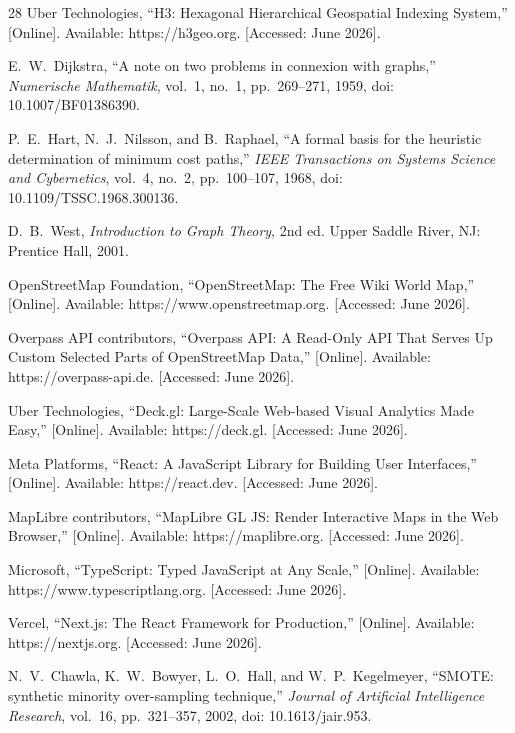 \documentclass[conference]{IEEEtran}
\begin{document}
\begin{thebibliography}{28}
Uber Technologies, ``H3: Hexagonal Hierarchical Geospatial Indexing System,'' [Online]. Available: https://h3geo.org. [Accessed: June 2026].

E.~W.~Dijkstra, ``A note on two problems in connexion with graphs,'' \emph{Numerische Mathematik}, vol.~1, no.~1, pp.~269--271, 1959, doi: 10.1007/BF01386390.

P.~E.~Hart, N.~J.~Nilsson, and B.~Raphael, ``A formal basis for the heuristic determination of minimum cost paths,'' \emph{IEEE Transactions on Systems Science and Cybernetics}, vol.~4, no.~2, pp.~100--107, 1968, doi: 10.1109/TSSC.1968.300136.

D.~B.~West, \emph{Introduction to Graph Theory}, 2nd ed. Upper Saddle River, NJ: Prentice Hall, 2001.

OpenStreetMap Foundation, ``OpenStreetMap: The Free Wiki World Map,'' [Online]. Available: https://www.openstreetmap.org. [Accessed: June 2026].

Overpass API contributors, ``Overpass API: A Read-Only API That Serves Up Custom Selected Parts of OpenStreetMap Data,'' [Online]. Available: https://overpass-api.de. [Accessed: June 2026].

Uber Technologies, ``Deck.gl: Large-Scale Web-based Visual Analytics Made Easy,'' [Online]. Available: https://deck.gl. [Accessed: June 2026].

Meta Platforms, ``React: A JavaScript Library for Building User Interfaces,'' [Online]. Available: https://react.dev. [Accessed: June 2026].

MapLibre contributors, ``MapLibre GL JS: Render Interactive Maps in the Web Browser,'' [Online]. Available: https://maplibre.org. [Accessed: June 2026].

Microsoft, ``TypeScript: Typed JavaScript at Any Scale,'' [Online]. Available: https://www.typescriptlang.org. [Accessed: June 2026].

Vercel, ``Next.js: The React Framework for Production,'' [Online]. Available: https://nextjs.org. [Accessed: June 2026].

N.~V.~Chawla, K.~W.~Bowyer, L.~O.~Hall, and W.~P.~Kegelmeyer, ``SMOTE: synthetic minority over-sampling technique,'' \emph{Journal of Artificial Intelligence Research}, vol.~16, pp.~321--357, 2002, doi: 10.1613/jair.953.


\end{thebibliography}
\end{document}
